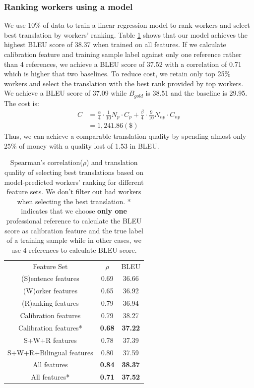 \documentclass[11pt,letterpaper]{article}
\begin{document}
\subsubsection{Ranking workers using a model}
We use 10\% of data to train a linear regression model to rank workers and select best translation by workers' ranking. Table \ref{lrresult} shows that our model achieves the highest BLEU score of 38.37 when trained on all features. If we calculate calibration feature and training sample label against only one reference rather than 4 references, we achieve a BLEU score of 37.52 with a correlation of 0.71 which is higher that two baselines. To  reduce cost, we retain only top 25\% workers and select the translation with the best rank provided by top workers. We achieve a BLEU score of 37.09 while $B_{gold}$ is 38.51 and the baseline is 29.95. The cost is:
 \begin{align*}
  C& = \frac{\alpha}{4} \cdot \frac{1}{10} N_{p}\cdot C_{p}  + \frac{\beta}{4} \cdot \frac{9}{10} N_{np} \cdot C_{np}\\
   & = 1,241.86 (\$)
 \end{align*}
 Thus, we can achieve a comparable translation quality by spending almost only 25\% of money with a quality lost of 1.53 in BLEU.
 
 
 
 \begin{table}[h]
 \center
\begin{tabular}{c|c|c}
\hline
Feature Set             & $\rho$  & BLEU  \\ \hhline{===}
(S)entence features     & 0.69 & 36.66 \\
(W)orker features       & 0.65 & 36.92 \\
(R)anking features      & 0.79 & 36.94 \\
Calibration features  & 0.79 & 38.27 \\
Calibration features* & \textbf{0.68} & \textbf{37.22} \\
S+W+R features          & 0.78 & 37.39 \\
S+W+R+Bilingual features        & 0.80 & 37.59 \\
All features            & \textbf{0.84} & \textbf{38.37} \\
All features*            & \textbf{0.71} & \textbf{37.52} \\ \hline
\end{tabular}
\caption{\label{lrresult} Spearman's correlation($\rho$) and translation quality of selecting best translations based on model-predicted workers' ranking for different feature sets. We don't filter out bad workers when selecting the best translation. * indicates that  we choose \textbf{only one} professional reference to calculate the BLEU score as calibration feature and the true label of a training sample while in other cases, we use 4 references to calculate BLEU score. }
\end{table}
\end{document}
